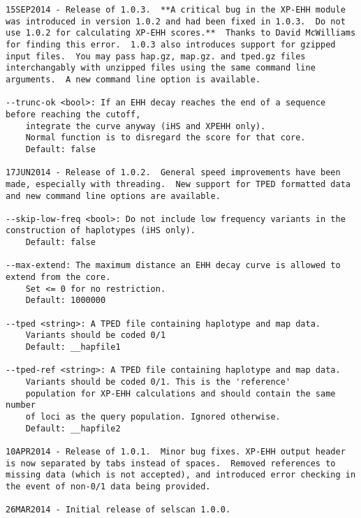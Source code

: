 \documentclass[12pt]{article}%
\begin{document}
\begin{lstlisting}
15SEP2014 - Release of 1.0.3.  **A critical bug in the XP-EHH module was introduced in version 1.0.2 and had been fixed in 1.0.3.  Do not use 1.0.2 for calculating XP-EHH scores.**  Thanks to David McWilliams for finding this error.  1.0.3 also introduces support for gzipped input files.  You may pass hap.gz, map.gz. and tped.gz files interchangably with unzipped files using the same command line arguments.  A new command line option is available.

--trunc-ok <bool>: If an EHH decay reaches the end of a sequence before reaching the cutoff,
	integrate the curve anyway (iHS and XPEHH only).
	Normal function is to disregard the score for that core.
	Default: false

17JUN2014 - Release of 1.0.2.  General speed improvements have been made, especially with threading.  New support for TPED formatted data and new command line options are available.

--skip-low-freq <bool>: Do not include low frequency variants in the construction of haplotypes (iHS only).
	Default: false

--max-extend: The maximum distance an EHH decay curve is allowed to extend from the core.
	Set <= 0 for no restriction.
	Default: 1000000

--tped <string>: A TPED file containing haplotype and map data.
	Variants should be coded 0/1
	Default: __hapfile1

--tped-ref <string>: A TPED file containing haplotype and map data.
	Variants should be coded 0/1. This is the 'reference'
	population for XP-EHH calculations and should contain the same number
	of loci as the query population. Ignored otherwise.
	Default: __hapfile2

10APR2014 - Release of 1.0.1.  Minor bug fixes. XP-EHH output header is now separated by tabs instead of spaces.  Removed references to missing data (which is not accepted), and introduced error checking in the event of non-0/1 data being provided.

26MAR2014 - Initial release of selscan 1.0.0.
\end{lstlisting}


\end{document}
